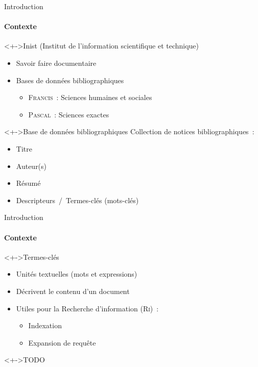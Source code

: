 \begin{frame}{Introduction}\framesubtitle{Contexte}

  \begin{block}<+->{Inist (Institut de l'information scientifique et technique)}
    \begin{itemize}
      \item{Savoir faire documentaire}
      \item{Bases de données bibliographiques}
      \begin{itemize}
        \item{\textsc{Francis}~: Sciences humaines et sociales}
        \item{\textsc{Pascal}~: Sciences exactes}
      \end{itemize}
    \end{itemize}
  \end{block}

  \begin{block}<+->{Base de données bibliographiques}
    Collection de notices bibliographiques~:
    \begin{itemize}
      \item{Titre}
      \item{Auteur(s)}
      \item{Résumé}
      \item{Descripteurs~/~Termes-clés (mots-clés)}
    \end{itemize}
  \end{block}
\end{frame}

\begin{frame}{Introduction}\framesubtitle{Contexte}
  \begin{block}<+->{Termes-clés}
    \begin{itemize}
      \item{Unités textuelles (mots et expressions)}
      \item{Décrivent le contenu d'un document}
      \item{Utiles pour la Recherche d'information (\textsc{Ri})~:}
      \begin{itemize}
        \item{Indexation}
        \item{Expansion de requête}
      \end{itemize}
    \end{itemize}
  \end{block}

  \begin{exampleblock}<+->{TODO}
  \end{exampleblock}
\end{frame}

